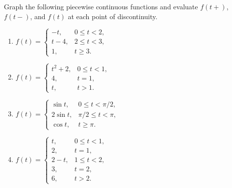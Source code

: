\documentclass{ximera}
\begin{document}
\begin{problem}\label{exer:8.1.4}
 Graph the following piecewise continuous functions and evaluate
$f(t+)$, $f(t-)$, and $f(t)$ at each point of discontinuity.

\begin{enumerate}
    \item $f(t)=\left\{\begin{array}{cl} -t,
& 0\le t<2,\\ t-4, & 2\le t<3,\\ 1, & t\ge
3.\end{array}\right.$
    \item $f(t)=\left\{\begin{array}{cl} t^2+2, & 0
\le t<1,\\4, & t=1,\\ t, & t>
1.\end{array}\right.$
    \item $f(t)=\left\{\begin{array}{rl}
\sin t, & 0\le t<\pi/ 2,\\ 2\sin t, &\pi/ 2
\le t<\pi,\\ \cos t, & t\ge\pi.\end{array}\right.$
    \item $f(t)=\left\{\begin{array}{cl}t,
 & 0\le t<1,\\ 2, & t=1,\\ 2-t, & 1
\le t<2,\\ 3, & t=2,\\ 6, & t>
2.\end{array}\right.$
\end{enumerate}
\end{problem}
\end{document}
